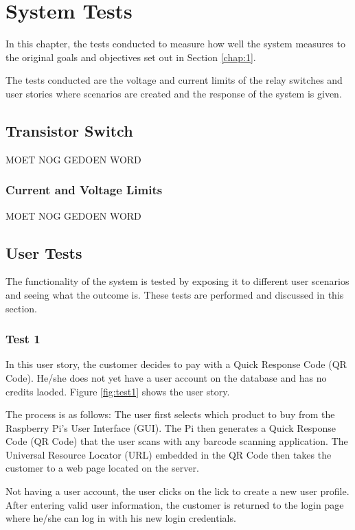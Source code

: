 \chapter{System Tests}
\label{chap:6}

In this chapter, the tests  conducted to measure how well the system measures to the
original goals and objectives set out in Section \ref{chap:1}. 

The tests conducted are the voltage and current limits of the relay switches and user
stories where scenarios are created and the response of the system is given. 

\section{Transistor Switch}

MOET NOG GEDOEN WORD

\subsection{Current and Voltage Limits}

MOET NOG GEDOEN WORD

\section{User Tests}

The functionality of the system is tested by exposing it to different user scenarios and
seeing what the outcome is. These tests are performed and discussed in this section.

\subsection{Test 1}

In this user story, the customer decides to pay with a Quick Response Code (QR Code).
He/she does not yet have a user account on the database and has no credits laoded. Figure
\ref{fig:test1} shows the user story. 

The process is as follows: The user first selects which product to buy from the Raspberry
Pi's User Interface (GUI). The Pi then generates a Quick Response Code (QR Code) that the
user scans with any barcode scanning application. The Universal Resource Locator (URL)
embedded in the QR Code then takes the customer to a web page located on the server. 

Not having a user account, the user clicks on the lick to create a new user profile. After
entering valid user information, the customer is returned to the login  page where he/she
can log in with his new login credentials. 

